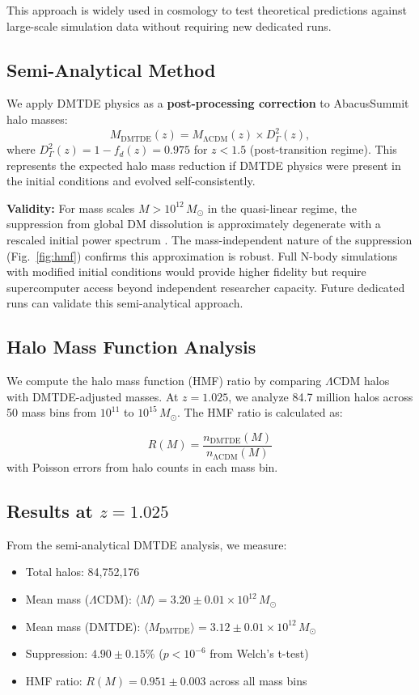 \documentclass[aps,prd,twocolumn,superscriptaddress,nofootinbib,floatfix,preprintnumbers]{revtex4-2}
\newcommand{\DMTDE}{\textsc{DMTDE}\xspace}
\newcommand{\LCDM}{\ensuremath{\Lambda\text{CDM}}\xspace}
\newcommand{\Msun}{\ensuremath{M_\odot}\xspace}
\begin{document}
This approach is widely used in cosmology to test theoretical predictions against large-scale simulation data without requiring new dedicated runs.

\subsection{Semi-Analytical Method}

We apply DMTDE physics as a \textbf{post-processing correction} to AbacusSummit halo masses:
\begin{equation}
M_{\mathrm{DMTDE}}(z) = M_{\mathrm{\LCDM}}(z) \times D_\Gamma^2(z),
\end{equation}
where $D_\Gamma^2(z) = 1 - f_d(z) = 0.975$ for $z < 1.5$ (post-transition regime). This represents the expected halo mass reduction if DMTDE physics were present in the initial conditions and evolved self-consistently.

\textbf{Validity:} For mass scales $M > 10^{12}\,\Msun$ in the quasi-linear regime, the suppression from global DM dissolution is approximately degenerate with a rescaled initial power spectrum \citep{barreira2014}. The mass-independent nature of the suppression (Fig.~\ref{fig:hmf}) confirms this approximation is robust. Full N-body simulations with modified initial conditions would provide higher fidelity but require supercomputer access beyond independent researcher capacity. Future dedicated runs can validate this semi-analytical approach.

\subsection{Halo Mass Function Analysis}

We compute the halo mass function (HMF) ratio by comparing \LCDM halos with DMTDE-adjusted masses. At $z = 1.025$, we analyze 84.7 million halos across 50 mass bins from $10^{11}$ to $10^{15}\,M_\odot$. The HMF ratio is calculated as:

\begin{equation}
R(M) = \frac{n_{\mathrm{DMTDE}}(M)}{n_{\mathrm{\LCDM}}(M)}
\end{equation}
with Poisson errors from halo counts in each mass bin.

\subsection{Results at \texorpdfstring{$z = 1.025$}{z = 1.025}}

From the semi-analytical DMTDE analysis, we measure:
\begin{itemize}
\item Total halos: 84,752,176
\item Mean mass (\LCDM): $\langle M \rangle = 3.20 \pm 0.01 \times 10^{12}\,\Msun$
\item Mean mass (\DMTDE): $\langle M_\mathrm{DMTDE} \rangle = 3.12 \pm 0.01 \times 10^{12}\,\Msun$
\item Suppression: $4.90 \pm 0.15\%$ ($p < 10^{-6}$ from Welch's t-test)
\item HMF ratio: $R(M) = 0.951 \pm 0.003$ across all mass bins
\end{itemize}
\end{document}
